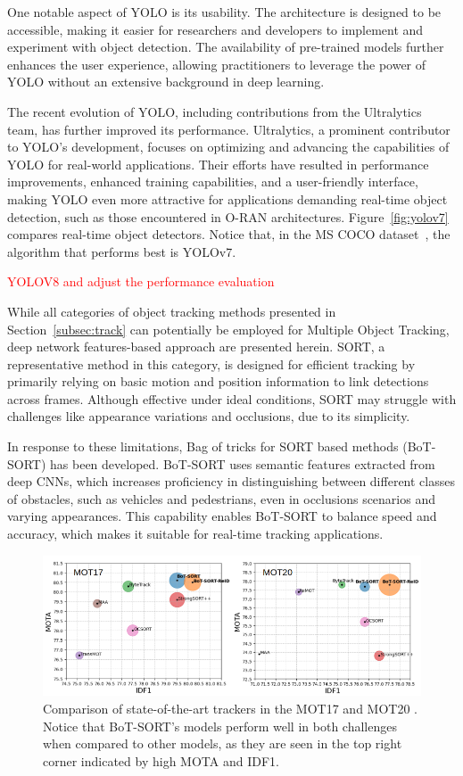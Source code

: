 One notable aspect of YOLO is its usability.
The architecture is designed to be accessible, making it easier for researchers and developers to implement and experiment with object detection.
The availability of pre-trained models further enhances the user experience, allowing practitioners to leverage the power of YOLO without an extensive background in deep learning.

The recent evolution of YOLO, including contributions from the Ultralytics~\cite{ultralytics_docs} team, has further improved its performance.
Ultralytics, a prominent contributor to YOLO's development, focuses on optimizing and advancing the capabilities of YOLO for real-world applications.
Their efforts have resulted in performance improvements, enhanced training capabilities, and a user-friendly interface, making YOLO even more attractive for applications demanding real-time object detection, such as those encountered in O-RAN architectures.
Figure~\ref{fig:yolov7} compares real-time object detectors.
Notice that, in the MS COCO dataset~\cite{COCO}, the algorithm that performs best is YOLOv7.

\textcolor{red}{YOLOV8 and adjust the performance evaluation}
\cite{yolov8}

While all categories of object tracking methods presented in Section~\ref{subsec:track} can potentially be employed for Multiple Object Tracking, deep network features-based approach are presented herein.
SORT, a representative method in this category, is designed for efficient tracking by primarily relying on basic motion and position information to link detections across frames.
Although effective under ideal conditions, SORT may struggle with challenges like appearance variations and occlusions, due to its simplicity.

In response to these limitations, Bag of tricks for SORT based methods (BoT-SORT)\cite{botsort} has been developed.
BoT-SORT uses semantic features extracted from deep CNNs, which increases proficiency in distinguishing between different classes of obstacles, such as vehicles and pedestrians, even in occlusions scenarios and varying appearances.
This capability enables BoT-SORT to balance speed and accuracy, which makes it suitable for real-time tracking applications.


\begin{figure}[H]
    \centering
    \includegraphics[width=0.8\linewidth]{figures/botsort}
    \caption[Comparison of state-of-the-art trackers in the MOT17 and MOT20]{ Comparison of state-of-the-art trackers in the MOT17 and MOT20 \cite{botsort}. Notice that BoT-SORT's models perform well in both challenges when compared to other models, as they are seen in the top right corner indicated by high MOTA and IDF1.}
    \label{fig:botsort}
\end{figure}

